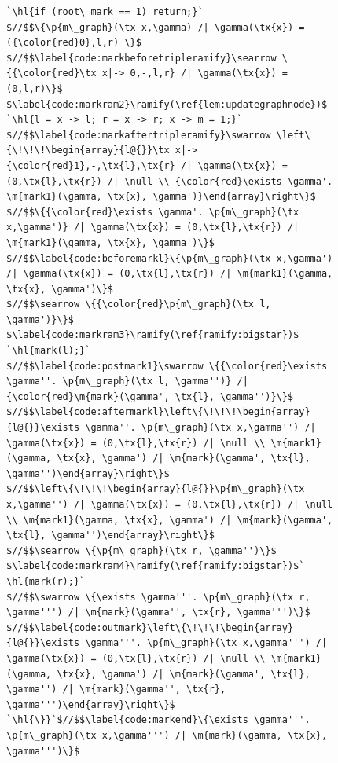 \documentclass[acmsmall,screen]{acmart}  %
\newcommand{\tx}[1]{\text{#1}}
\newcommand{\p}[1]{\ensuremath{\mathsf{#1}}} \newcommand{\m}[1]{\ensuremath{\mathit{#1}}} \newcommand{\ma}[1]{\ensuremath{\mathcal{#1}}} \let\ramify\lightning
\newcommand{\hl}[1]{\colorbox{lightgray}{#1}} %
\begin{document}
\begin{figure}[t]
\begin{lstlisting}[multicols=2]
 `\hl{if (root\_mark == 1) return;}`
$//$$\{\p{m\_graph}(\tx x,\gamma) /| \gamma(\tx{x}) = ({\color{red}0},l,r) \}$
$//$$\label{code:markbeforetripleramify}\searrow \{{\color{red}\tx x|-> 0,-,l,r} /| \gamma(\tx{x}) = (0,l,r)\}$
$\label{code:markram2}\ramify(\ref{lem:updategraphnode})$ `\hl{l = x -> l; r = x -> r; x -> m = 1;}`
$//$$\label{code:markaftertripleramify}\swarrow \left\{\!\!\!\begin{array}{l@{}}\tx x|-> {\color{red}1},-,\tx{l},\tx{r} /| \gamma(\tx{x}) = (0,\tx{l},\tx{r}) /| \null \\ {\color{red}\exists \gamma'. \m{mark1}(\gamma, \tx{x}, \gamma')}\end{array}\right\}$
$//$$\{{\color{red}\exists \gamma'. \p{m\_graph}(\tx x,\gamma')} /| \gamma(\tx{x}) = (0,\tx{l},\tx{r}) /| \m{mark1}(\gamma, \tx{x}, \gamma')\}$
$//$$\label{code:beforemarkl}\{\p{m\_graph}(\tx x,\gamma') /| \gamma(\tx{x}) = (0,\tx{l},\tx{r}) /| \m{mark1}(\gamma, \tx{x}, \gamma')\}$
$//$$\searrow \{{\color{red}\p{m\_graph}(\tx l, \gamma')}\}$
$\label{code:markram3}\ramify(\ref{ramify:bigstar})$ `\hl{mark(l);}`
$//$$\label{code:postmark1}\swarrow \{{\color{red}\exists \gamma''. \p{m\_graph}(\tx l, \gamma'')} /| {\color{red}\m{mark}(\gamma', \tx{l}, \gamma'')}\}$
$//$$\label{code:aftermarkl}\left\{\!\!\!\begin{array}{l@{}}\exists \gamma''. \p{m\_graph}(\tx x,\gamma'') /| \gamma(\tx{x}) = (0,\tx{l},\tx{r}) /| \null \\ \m{mark1}(\gamma, \tx{x}, \gamma') /| \m{mark}(\gamma', \tx{l}, \gamma'')\end{array}\right\}$
$//$$\left\{\!\!\!\begin{array}{l@{}}\p{m\_graph}(\tx x,\gamma'') /| \gamma(\tx{x}) = (0,\tx{l},\tx{r}) /| \null \\ \m{mark1}(\gamma, \tx{x}, \gamma') /| \m{mark}(\gamma', \tx{l}, \gamma'')\end{array}\right\}$
$//$$\searrow \{\p{m\_graph}(\tx r, \gamma'')\}$
$\label{code:markram4}\ramify(\ref{ramify:bigstar})$` \hl{mark(r);}`
$//$$\swarrow \{\exists \gamma'''. \p{m\_graph}(\tx r, \gamma''') /| \m{mark}(\gamma'', \tx{r}, \gamma''')\}$
$//$$\label{code:outmark}\left\{\!\!\!\begin{array}{l@{}}\exists \gamma'''. \p{m\_graph}(\tx x,\gamma''') /| \gamma(\tx{x}) = (0,\tx{l},\tx{r}) /| \null \\ \m{mark1}(\gamma, \tx{x}, \gamma') /| \m{mark}(\gamma', \tx{l}, \gamma'') /| \m{mark}(\gamma'', \tx{r}, \gamma''')\end{array}\right\}$
`\hl{\}}`$//$$\label{code:markend}\{\exists \gamma'''. \p{m\_graph}(\tx x,\gamma''') /| \m{mark}(\gamma, \tx{x}, \gamma''')\}$
\end{lstlisting}


\end{figure}
\end{document}
